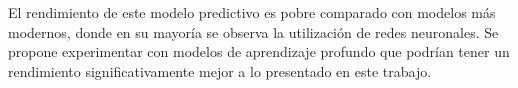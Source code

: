 \documentclass[journal]{IEEEtran}
\begin{document}
El rendimiento de este modelo predictivo es pobre comparado con modelos más modernos, donde en su mayoría se observa la utilización de redes neuronales\cite{paperswithcode_svhn}. Se propone experimentar con modelos de aprendizaje profundo que podrían tener un rendimiento significativamente mejor a lo presentado en este trabajo.


%


\printbibliography
\end{document}
